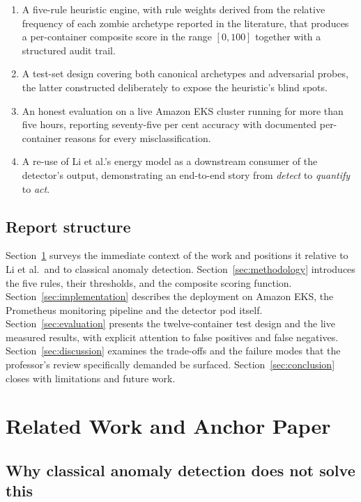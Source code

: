\documentclass[11pt,a4paper,oneside]{article}
\begin{document}
\begin{enumerate}[leftmargin=*]
\item A five-rule heuristic engine, with rule weights derived from the
relative frequency of each zombie archetype reported in the literature,
that produces a per-container composite score in the range
\([0,100]\) together with a structured audit trail.
\item A test-set design covering both canonical archetypes and adversarial
probes, the latter constructed deliberately to expose the heuristic's
blind spots.
\item An honest evaluation on a live Amazon EKS cluster running for more
than five hours, reporting seventy-five per cent accuracy with
documented per-container reasons for every misclassification.
\item A re-use of Li et al.'s energy model as a downstream consumer of
the detector's output, demonstrating an end-to-end story from
\emph{detect} to \emph{quantify} to \emph{act}.
\end{enumerate}

\subsection{Report structure}

Section~\ref{sec:related} surveys the immediate context of the work and
positions it relative to Li et al.\ and to classical anomaly detection.
Section~\ref{sec:methodology} introduces the five rules, their thresholds,
and the composite scoring function. Section~\ref{sec:implementation}
describes the deployment on Amazon EKS, the Prometheus monitoring pipeline
and the detector pod itself. Section~\ref{sec:evaluation} presents the
twelve-container test design and the live measured results, with explicit
attention to false positives and false negatives.
Section~\ref{sec:discussion} examines the trade-offs and the failure modes
that the professor's review specifically demanded be surfaced.
Section~\ref{sec:conclusion} closes with limitations and future work.

\section{Related Work and Anchor Paper}
\label{sec:related}

\subsection{Why classical anomaly detection does not solve this}
\end{document}
